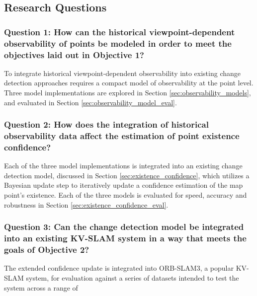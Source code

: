 \subsection{Research Questions}

\subsubsection*{Question 1: How can the historical viewpoint-dependent observability of points be modeled in order to meet the objectives laid out in Objective 1?}

To integrate historical viewpoint-dependent observability into existing change detection approaches requires a compact model of observability at the point level. Three model implementations are explored in Section \ref{sec:observability_models}, and evaluated in Section \ref{sec:observability_model_eval}.

\subsubsection*{Question 2: How does the integration of historical observability data affect the estimation of point existence confidence?}

Each of the three model implementations is integrated into an existing change detection model, discussed in Section \ref{sec:existence_confidence}, which utilizes a Bayesian update step to iteratively update a confidence estimation of the map point's existence. Each of the three models is evaluated for speed, accuracy and robustness in Section \ref{sec:existence_confidence_eval}.

\subsubsection*{Question 3: Can the change detection model be integrated into an existing KV-SLAM system in a way that meets the goals of Objective 2?}

The extended confidence update is integrated into ORB-SLAM3, a popular KV-SLAM system, for evaluation against a series of datasets intended to test the system across a range of 